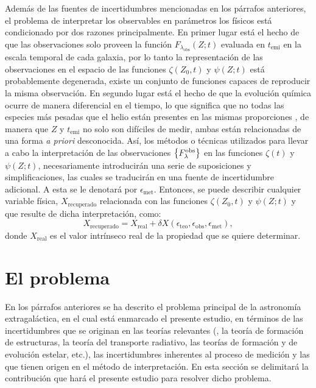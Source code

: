 Además de las fuentes de incertidumbres mencionadas en los párrafos anteriores, el problema de
interpretar los observables en parámetros los físicos está condicionado por dos razones
principalmente. En primer lugar está el hecho de que las observaciones solo proveen la función
$F_{\lambda_\text{obs}}(Z;t)$ evaluada en $t_\text{emi}$ en la escala temporal de cada galaxia, por
lo tanto la representación de las observaciones en el espacio de las funciones $\zeta(Z_0,t)$ y
$\psi(Z;t)$ está probablemente degenerada, \ie existe un conjunto de funciones capaces de reproducir
la misma observación. En segundo lugar está el hecho de que la evolución química ocurre de manera
diferencial en el tiempo, lo que significa que no todas las especies más pesadas que el helio están
presentes en las mismas proporciones \citep[\eg,][]{Yates2013}, de manera que $Z$ y $t_\text{emi}$
no solo son difíciles de medir, ambas están relacionadas de una forma \emph{a priori} desconocida.
Así, los métodos o técnicas utilizados para llevar a cabo la interpretación de las observaciones
$\set{\sedt[F]{obs}}$ en las funciones $\zeta(t)$ y $\psi(Z;t)$, necesariamente introducirán una
serie de suposiciones y simplificaciones, las cuales se traducirán en una fuente de incertidumbre
adicional. A esta se le denotará por $\epsilon_\text{met}$. Entonces, se puede describir cualquier
variable física, $X_\text{recuperado}$ relacionada con las funciones $\zeta(Z_0,t)$ y $\psi(Z;t)$ y
que resulte de dicha interpretación, como:
%
\begin{equation}\label{ec:uncertainties}
X_\text{recuperado} = X_\text{real} + \delta{X}(\epsilon_\text{teo},\epsilon_\text{obs},\epsilon_\text{met}),
\end{equation}
%
donde $X_\text{real}$ es el valor intrínseco real de la propiedad que se quiere determinar.

\section{El problema}

En los párrafos anteriores se ha descrito el problema principal de la astronomía extragaláctica, en
el cual está enmarcado el presente estudio, en términos de las incertidumbres que se originan en las
teorías relevantes (\eg, la teoría de formación de estructuras, la teoría del transporte radiativo,
las teorías de formación y de evolución estelar, etc.), las incertidumbres inherentes al proceso de
medición y las que tienen origen en el método de interpretación. En esta sección se delimitará la
contribución que hará el presente estudio para resolver dicho problema.

